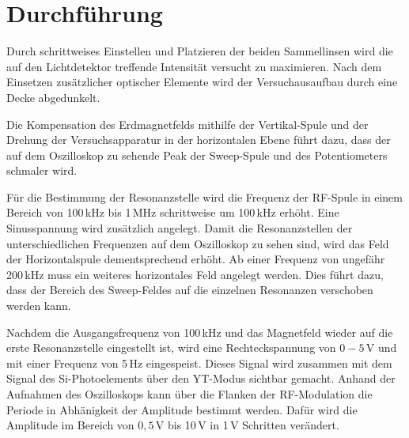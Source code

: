 \section{Durchführung}
Durch schrittweises Einstellen und Platzieren der beiden Sammellinsen wird die auf den Lichtdetektor
treffende Intensität versucht zu maximieren. Nach dem Einsetzen zusätzlicher optischer Elemente wird
der Versuchausaufbau durch eine Decke abgedunkelt.

Die Kompensation des Erdmagnetfelds mithilfe der Vertikal-Spule und der Drehung der Versuchsapparatur in der
horizontalen Ebene führt dazu, dass der auf dem Oszilloskop zu sehende Peak der Sweep-Spule und des Potentiometers
schmaler wird.

Für die Bestimmung der Resonanzstelle wird die Frequenz der RF-Spule in einem Bereich von 100\,kHz bis
1\,MHz schrittweise um 100\,kHz erhöht. Eine Sinusspannung wird zusätzlich angelegt.
Damit die Resonanzstellen der unterschiedlichen Frequenzen auf dem Oszilloskop zu sehen sind, wird
das Feld der Horizontalspule dementsprechend erhöht.
Ab einer Frequenz von ungefähr 200\,kHz muss ein weiteres horizontales Feld angelegt werden. Dies führt dazu,
dass der Bereich des Sweep-Feldes auf die einzelnen Resonanzen verschoben werden kann.

Nachdem die Ausgangsfrequenz von 100\,kHz und das Magnetfeld wieder auf die erste Resonanzstelle eingestellt ist,
wird eine Rechteckspannung von $0-5$\,V und mit einer Frequenz von 5\,Hz eingespeist. Dieses Signal
wird zusammen mit dem Signal des Si-Photoelements über den YT-Modus sichtbar gemacht.
Anhand der Aufnahmen des Oszilloskops kann über die Flanken der RF-Modulation
die Periode in Abhänigkeit der Amplitude bestimmt werden. Dafür wird die Amplitude im Bereich von $0,5$\,V bis 10\,V
in 1\,V Schritten verändert.

